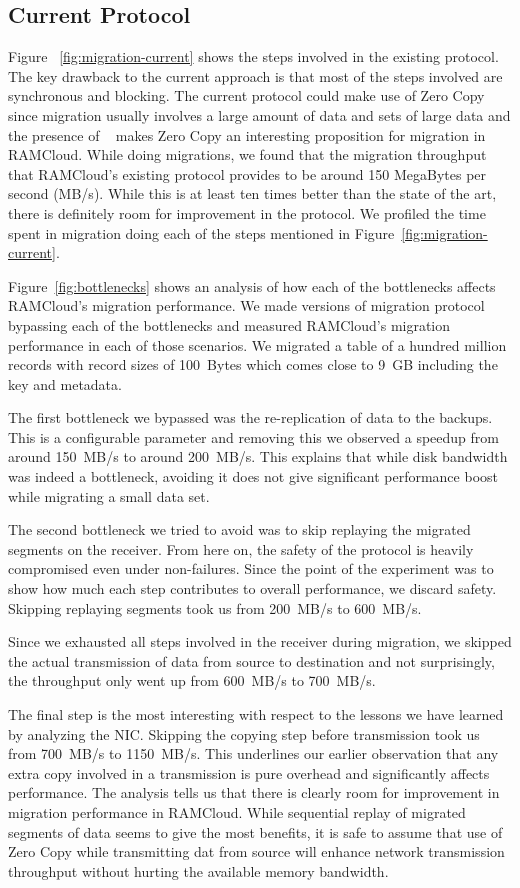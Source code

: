 \subsection{Current Protocol}
Figure ~\ref{fig:migration-current} shows the steps involved in the existing protocol. The key drawback to the current approach is that 
most of the steps involved are synchronous and blocking. The current protocol could make use of Zero Copy since migration usually involves a 
large amount of data and sets of large data and the presence of ~\cite{ramcloudtx} makes Zero Copy an interesting proposition 
for migration in RAMCloud. While doing migrations, we found that the migration throughput that RAMCloud's existing protocol provides to 
be around 150 MegaBytes per second (MB/s). While this is at least ten times better than the state of the art, there is definitely room for improvement in the protocol.
We profiled the time spent in migration doing each of the steps mentioned in Figure~\ref{fig:migration-current}.

Figure~\ref{fig:bottlenecks} shows an analysis of how each of the bottlenecks affects RAMCloud's migration performance. We made versions of migration 
protocol bypassing each of the bottlenecks and measured RAMCloud's migration performance in each of those scenarios. We migrated a table of a hundred million 
records with record sizes of 100~Bytes which comes close to 9~GB including the key and metadata.

The first bottleneck we bypassed was the re-replication of data to the backups. This is a configurable parameter and removing this we observed a speedup from around 150~MB/s to around 
200~MB/s. This explains that while disk bandwidth was indeed a bottleneck, avoiding it does not give significant performance boost while migrating a small data set.

The second bottleneck we tried to avoid was to skip replaying the migrated segments on the receiver. From here on, the safety of the protocol is heavily compromised even under 
 non-failures. Since the point of the experiment was to show how much each step contributes to overall performance, we discard safety. Skipping replaying segments took us from 
 200~MB/s to 600~MB/s. 

Since we exhausted all steps involved in the receiver during migration, we skipped the actual transmission of data from source to destination and not surprisingly, the throughput 
only went up from 600~MB/s to 700~MB/s. 

The final step is the most interesting with respect to the lessons we have learned by analyzing the NIC. Skipping the copying step before transmission took us from 700~MB/s to 
1150~MB/s. This underlines our earlier observation that any extra copy involved in a transmission is pure overhead and significantly affects performance. 
The analysis tells us that there is clearly room for improvement in migration performance in RAMCloud. While sequential replay of migrated segments of data seems to give the most benefits, 
it is safe to assume that use of Zero Copy while transmitting dat from source will enhance network transmission throughput without hurting the available memory bandwidth.

